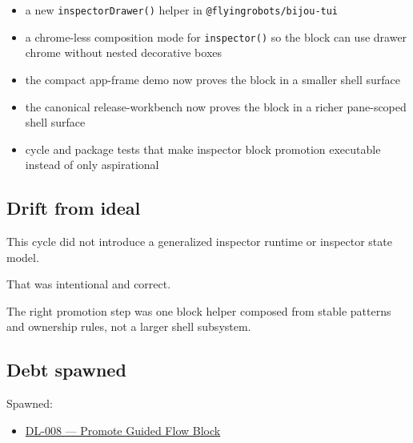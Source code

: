 \begin{itemize}
\tightlist
\item
  a new \texttt{i\allowbreak{}n\allowbreak{}s\allowbreak{}p\allowbreak{}e\allowbreak{}c\allowbreak{}t\allowbreak{}o\allowbreak{}r\allowbreak{}D\allowbreak{}r\allowbreak{}a\allowbreak{}w\allowbreak{}e\allowbreak{}r\allowbreak{}(\allowbreak{})} helper in \texttt{@\allowbreak{}f\allowbreak{}l\allowbreak{}y\allowbreak{}i\allowbreak{}n\allowbreak{}g\allowbreak{}r\allowbreak{}o\allowbreak{}b\allowbreak{}o\allowbreak{}t\allowbreak{}s\allowbreak{}/\allowbreak{}b\allowbreak{}i\allowbreak{}j\allowbreak{}o\allowbreak{}u\allowbreak{}-\allowbreak{}t\allowbreak{}u\allowbreak{}i}
\item
  a chrome-less composition mode for \texttt{i\allowbreak{}n\allowbreak{}s\allowbreak{}p\allowbreak{}e\allowbreak{}c\allowbreak{}t\allowbreak{}o\allowbreak{}r\allowbreak{}(\allowbreak{})} so the block can use drawer chrome without nested decorative boxes
\item
  the compact app-frame demo now proves the block in a smaller shell surface
\item
  the canonical release-workbench now proves the block in a richer pane-scoped shell surface
\item
  cycle and package tests that make inspector block promotion executable instead of only aspirational
\end{itemize}

\subsection{Drift from ideal}\label{record-174-drift-from-ideal}

This cycle did not introduce a generalized inspector runtime or inspector state model.

That was intentional and correct.

The right promotion step was one block helper composed from stable patterns and ownership rules, not a larger shell subsystem.

\subsection{Debt spawned}\label{record-174-debt-spawned}

Spawned:

\begin{itemize}
\tightlist
\item
  \href{https://github.com/flyingrobots/bijou/blob/cbd70612140e7a450d764b3c7be1c6af878b99bc/docs/method/graveyard/legacy-backlog/DL-008-promote-guided-flow-block.md}{DL-008 --- Promote Guided Flow Block}
\end{itemize}

